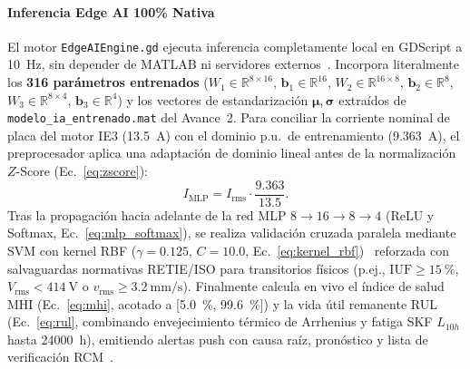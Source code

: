 \paragraph*{Inferencia Edge AI 100\% Nativa}
El motor \texttt{EdgeAIEngine.gd} ejecuta inferencia completamente local en GDScript a \qty{10}{\hertz}, sin depender de MATLAB ni servidores externos~\cite{EdgeCloud2022,AI2026}. Incorpora literalmente los \textbf{316 parámetros entrenados} ($W_1\in\mathbb{R}^{8\times 16}$, $\mathbf{b}_1\in\mathbb{R}^{16}$, $W_2\in\mathbb{R}^{16\times 8}$, $\mathbf{b}_2\in\mathbb{R}^{8}$, $W_3\in\mathbb{R}^{8\times 4}$, $\mathbf{b}_3\in\mathbb{R}^{4}$) y los vectores de estandarización $\boldsymbol{\mu},\boldsymbol{\sigma}$ extraídos de \texttt{modelo\_\allowbreak ia\_\allowbreak entrenado.mat} del Avance~2. Para conciliar la corriente nominal de placa del motor IE3 (\qty{13.5}{\ampere}) con el dominio p.u.\ de entrenamiento (\qty{9.363}{\ampere}), el preprocesador aplica una adaptación de dominio lineal antes de la normalización $Z$-Score (Ec.~\eqref{eq:zscore}):
\begin{equation}
I_{\text{MLP}} = I_{\text{rms}} \cdot \frac{9.363}{13.5}.
\label{eq:godot_adaptacion}
\end{equation}
Tras la propagación hacia adelante de la red MLP $8\to 16\to 8\to 4$ (ReLU y Softmax, Ec.~\eqref{eq:mlp_softmax}), se realiza validación cruzada paralela mediante SVM con kernel RBF ($\gamma=\num{0.125}$, $C=\num{10.0}$, Ec.~\eqref{eq:kernel_rbf})~\cite{Gangsar2020,Soualhi2022} reforzada con salvaguardas normativas RETIE/ISO para transitorios físicos (p.ej., $\text{IUF}\ge\qty{15}{\percent}$, $V_{\text{rms}}<\qty{414}{\volt}$ o $v_{\text{rms}}\ge\qty{3.2}{\milli\meter\per\second}$). Finalmente calcula en vivo el índice de salud MHI (Ec.~\eqref{eq:mhi}, acotado a [\qty{5.0}{\percent}, \qty{99.6}{\percent}]) y la vida útil remanente RUL (Ec.~\eqref{eq:rul}, combinando envejecimiento térmico de Arrhenius y fatiga SKF $L_{10h}$ hasta \qty{24000}{\hour}), emitiendo alertas push con causa raíz, pronóstico y lista de verificación RCM~\cite{Moubray1997}.

